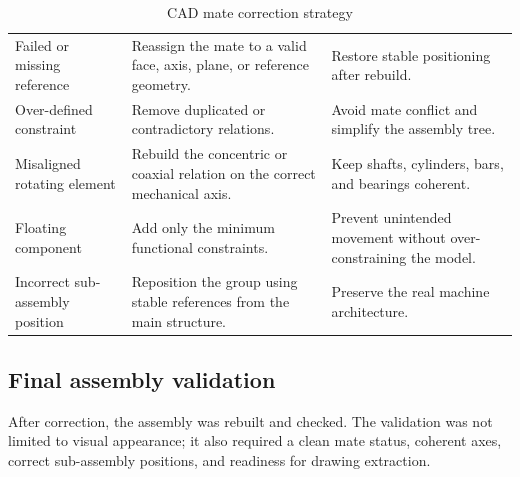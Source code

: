 \begin{table}[H]
\centering
\small
\caption{CAD mate correction strategy}
\label{tab:chapter2-3}
\begin{tabularx}{\textwidth}{|P{0.25\textwidth}|P{0.34\textwidth}|Y|}
\hline
{}
 &  &  \\
\hline
Failed or missing reference & Reassign the mate to a valid face, axis, plane, or reference geometry. & Restore stable positioning after rebuild. \\
\hline
Over-defined constraint & Remove duplicated or contradictory relations. & Avoid mate conflict and simplify the assembly tree. \\
\hline
Misaligned rotating element & Rebuild the concentric or coaxial relation on the correct mechanical axis. & Keep shafts, cylinders, bars, and bearings coherent. \\
\hline
Floating component & Add only the minimum functional constraints. & Prevent unintended movement without over-constraining the model. \\
\hline
Incorrect sub-assembly position & Reposition the group using stable references from the main structure. & Preserve the real machine architecture. \\
\hline
\end{tabularx}
\end{table}

\subsection{Final assembly validation}

After correction, the assembly was rebuilt and checked. The validation was not limited to visual appearance; it also required a clean mate status, coherent axes, correct sub-assembly positions, and readiness for drawing extraction.

